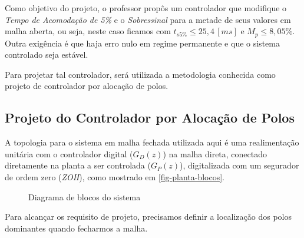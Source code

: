 \documentclass[
	12pt,				%
	article,			%
	openright,			%
	oneside,
	a4paper,			%
	chapter=TITLE,		%
	section=TITLE,		%
	english,			%
	french,				%
	spanish,			%
	brazil,				%
]{abntex2}
\begin{document}
            Como objetivo do projeto, o professor propôs um controlador que modifique o \textit{Tempo de Acomodação de 5\%} e o \textit{Sobressinal} para a metade de seus valores em malha aberta, ou seja, neste caso ficamos com $t_{s5\%}\leq25,4\,[ms]$ e $M_{p}\leq8,05\%$. Outra exigência é que haja erro nulo em regime permanente e que o sistema controlado seja estável.
            
            Para projetar tal controlador, será utilizada a metodologia conhecida como projeto de controlador por alocação de polos.
        
        \subsection{Projeto do Controlador por Alocação de Polos}
        
            A topologia para o sistema em malha fechada utilizada aqui é uma realimentação unitária com o controlador digital ($G_D(z)$) na malha direta, conectado diretamente na planta a ser controlada ($G_P(z)$), digitalizada com um segurador de ordem zero (\textit{ZOH}), como mostrado em \autoref{fig-planta-blocos}.
            
            \begin{figure}[htbp]
                \centering
                \caption{Diagrama de blocos do sistema}
                \label{fig-planta-blocos}
            \end{figure}
            
            
            Para alcançar os requisito de projeto, precisamos definir a localização dos polos dominantes quando fecharmos a malha. 
            
\end{document}
